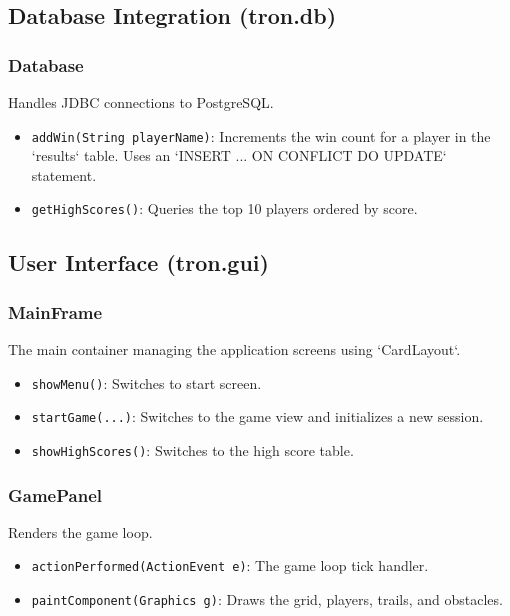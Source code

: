 \documentclass[12pt,a4paper]{article}
\begin{document}
\subsection{Database Integration (tron.db)}

\subsubsection{Database}
Handles JDBC connections to PostgreSQL.

\begin{itemize}
    \item \texttt{addWin(String playerName)}: Increments the win count for a player in the `results` table. Uses an `INSERT ... ON CONFLICT DO UPDATE` statement.
    \item \texttt{getHighScores()}: Queries the top 10 players ordered by score.
\end{itemize}

\subsection{User Interface (tron.gui)}

\subsubsection{MainFrame}
The main container managing the application screens using `CardLayout`.

\begin{itemize}
    \item \texttt{showMenu()}: Switches to start screen.
    \item \texttt{startGame(...)}: Switches to the game view and initializes a new session.
    \item \texttt{showHighScores()}: Switches to the high score table.
\end{itemize}

\subsubsection{GamePanel}
Renders the game loop.

\begin{itemize}
    \item \texttt{actionPerformed(ActionEvent e)}: The game loop tick handler.
    \item \texttt{paintComponent(Graphics g)}: Draws the grid, players, trails, and obstacles.
\end{itemize}
\end{document}
